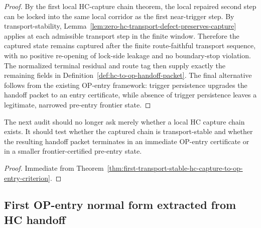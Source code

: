 \begin{proof}
By the first local HC-capture chain theorem, the local repaired second step can be locked into the same local corridor as the first near-trigger step. By transport-stability, Lemma~\ref{lem:zero-hc-transport-defect-preserves-capture} applies at each admissible transport step in the finite window. Therefore the captured state remains captured after the finite route-faithful transport sequence, with no positive re-opening of lock-side leakage and no boundary-stop violation. The normalized terminal residual and route tag then supply exactly the remaining fields in Definition~\ref{def:hc-to-op-handoff-packet}. The final alternative follows from the existing OP-entry framework: trigger persistence upgrades the handoff packet to an entry certificate, while absence of trigger persistence leaves a legitimate, narrowed pre-entry frontier state.
\end{proof}

\begin{corollary}
\label{cor:v3340-r01-working-rule}
The next audit should no longer ask merely whether a local HC capture chain exists. It should test whether the captured chain is transport-stable and whether the resulting handoff packet terminates in an immediate OP-entry certificate or in a smaller frontier-certified pre-entry state.
\end{corollary}

\begin{proof}
Immediate from Theorem~\ref{thm:first-transport-stable-hc-capture-to-op-entry-criterion}.
\end{proof}



\subsection{First OP-entry normal form extracted from HC handoff}
\label{subsec:first-op-entry-normal-form-extracted-from-hc-handoff}


